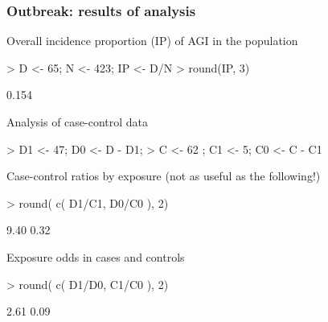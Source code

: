 \documentclass[handout,12pt,dvipsnames,t]{beamer}
\begin{document}
\begin{frame}[fragile]
\frametitle{Outbreak: results of analysis}

Overall incidence proportion (IP) of AGI in the population

\scriptsize{
\begin{Schunk}
\begin{Sinput}
> D <- 65; N <- 423; IP <- D/N 
> round(IP, 3)
\end{Sinput}
\begin{Soutput}
[1] 0.154
\end{Soutput}
\end{Schunk}
}

\normalsize
Analysis of case-control data
\scriptsize{
\begin{Schunk}
\begin{Sinput}
> D1 <- 47; D0 <- D - D1; 
> C <- 62 ; C1 <- 5; C0 <- C - C1
\end{Sinput}
\end{Schunk}
}

\normalsize
Case-control ratios by exposure (not as useful as the following!)
\scriptsize{
\begin{Schunk}
\begin{Sinput}
> round( c( D1/C1, D0/C0 ), 2)
\end{Sinput}
\begin{Soutput}
[1] 9.40 0.32
\end{Soutput}
\end{Schunk}
}
\normalsize
Exposure odds in cases and controls

\scriptsize{
\begin{Schunk}
\begin{Sinput}
> round( c( D1/D0, C1/C0 ), 2)
\end{Sinput}
\begin{Soutput}
[1] 2.61 0.09
\end{Soutput}
\end{Schunk}
}
\end{frame}
\end{document}
